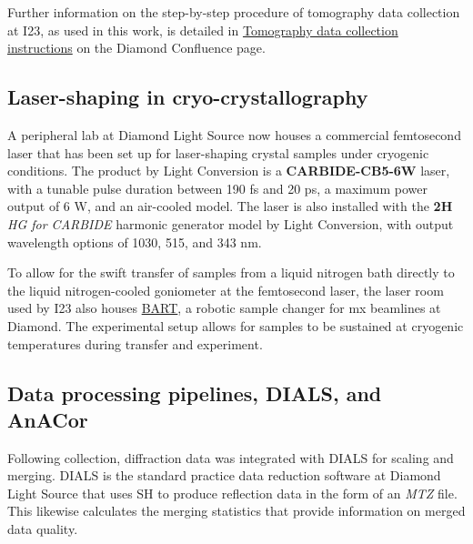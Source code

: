 Further information on the step-by-step procedure of tomography data collection at I23, as used in this work, is detailed in \href{https://confluence.diamond.ac.uk/x/h4HVDQ}{Tomography data collection instructions} on the Diamond Confluence page.

\subsection{Laser-shaping in cryo-crystallography}
A peripheral lab at Diamond Light Source now houses a commercial femtosecond laser  that has been set up for laser-shaping crystal samples under cryogenic conditions. The product by Light Conversion is a \textbf{CARBIDE-CB5-6W} laser, with a tunable pulse duration between 190 \unit{fs} and 20 \unit{ps}, a maximum power output of 6 \unit{W}, and an air-cooled model. The laser is also installed with the \textbf{2H} \textit{HG for CARBIDE} harmonic generator model by Light Conversion, with output wavelength options of 1030, 515, and 343 \unit{nm}.%

To allow for the swift transfer of samples from a liquid nitrogen bath directly to the liquid nitrogen-cooled goniometer at the femtosecond laser, the laser room used by I23 also houses \href{https://www.diamond.ac.uk/Home/Corporate-Literature/Annual-Review/Review2015/Villages/Macromolecular-Crystallography-Village/Macromolecular-Crystallography-Village-Developments/BART---the-new-robotic-sample-changer-for-MX-beamlines-at-Diamond.html}{BART}, a robotic sample changer for \ac{mx} beamlines at Diamond. The experimental setup allows for samples to be sustained at cryogenic temperatures during transfer and experiment.

\subsection{Data processing pipelines, DIALS, and AnACor}

Following collection, diffraction data was integrated with DIALS for scaling and merging. DIALS is the standard practice data reduction software at Diamond Light Source that uses SH to produce reflection data in the form of an \textit{MTZ} file. This likewise calculates the merging statistics that provide information on merged data quality.%

